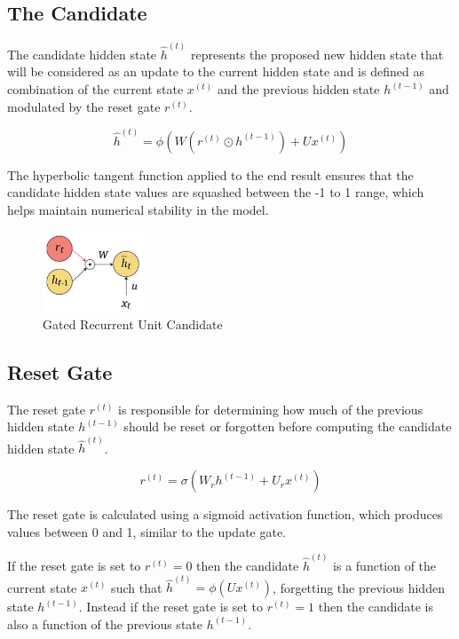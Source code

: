 \subsection{The Candidate}

The candidate hidden state $\hat{h}^{(t)}$ represents the proposed new hidden state that will be considered as an update to the current hidden state and is defined  as combination of the current state $x^{(t)}$ and the previous hidden state $h^{(t-1)}$ and modulated by the reset gate $r^{(t)}$. 

$$ \hat{h}^{(t)} = \phi ( W (r^{(t)} \odot h^{(t-1)}) + U x^{(t)} )  $$

The hyperbolic tangent function applied to the end result ensures that the candidate hidden state values are squashed between the -1 to 1 range, which helps maintain numerical stability in the model.

\begin{figure}[h]
    \centering
    \includegraphics[width=3cm]{Images/candidate.png}
    \caption{Gated Recurrent Unit Candidate }
    \label{fig:candidate}
\end{figure}

\newpage
\subsection{Reset Gate}

The reset gate $r^{(t)}$ is responsible for determining how much of the previous hidden state $h^{(t-1)}$ should be reset or forgotten before computing the candidate hidden state $\hat{h}^{(t)}$.


$$ r^{(t)} = \sigma (W_r h^{(t-1)} + U_r x^{(t)}) $$

\noindent The reset gate is calculated using a sigmoid activation function, which produces values between 0 and 1, similar to the update gate.

\noindent If the reset gate is set to $r^{(t)} = 0$ then the candidate $\hat{h}^{(t)}$ is a function of the current state $x^{(t)}$ such that $\hat{h}^{(t)} = \phi \left( U x^{(t)} \right)$, forgetting the previous hidden state $h^{(t-1)}$. Instead if the reset gate is set to $r^{(t)} = 1$ then the candidate is also a function of the previous state $h^{(t-1)}$.

